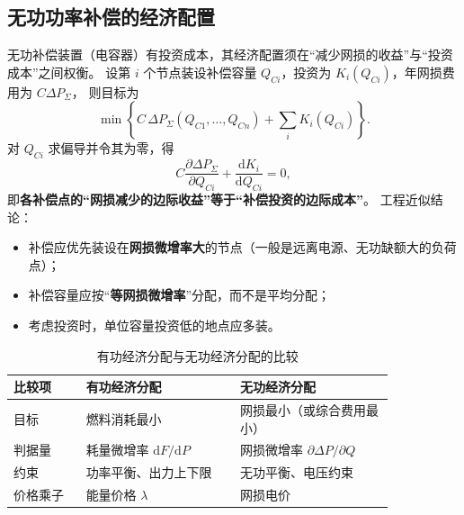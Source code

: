 \subsection{无功功率补偿的经济配置}

无功补偿装置（电容器）有投资成本，其经济配置须在“减少网损的收益”与“投资成本”之间权衡。
设第 $i$ 个节点装设补偿容量 $Q_{Ci}$，投资为 $K_i(Q_{Ci})$，年网损费用为 $C\Delta P_{\Sigma}$，
则目标为
\begin{equation}
  \min\left\{C\,\Delta P_{\Sigma}\left(Q_{C1},\dots,Q_{Cn}\right)+\sum_{i}K_i\left(Q_{Ci}\right)\right\}.
\end{equation}
对 $Q_{Ci}$ 求偏导并令其为零，得
\begin{equation}
  C\frac{\partial\Delta P_{\Sigma}}{\partial Q_{Ci}}+\frac{\mathrm{d}K_i}{\mathrm{d}Q_{Ci}}=0 ,
\end{equation}
即\textbf{各补偿点的“网损减少的边际收益”等于“补偿投资的边际成本”}。
工程近似结论：
\begin{itemize}
  \item 补偿应优先装设在\textbf{网损微增率大}的节点（一般是远离电源、无功缺额大的负荷点）；
  \item 补偿容量应按“\textbf{等网损微增率}”分配，而不是平均分配；
  \item 考虑投资时，单位容量投资低的地点应多装。
\end{itemize}

\begin{table}[htbp]
  \centering
  \caption{有功经济分配与无功经济分配的比较}
  \small
  \begin{tabular}{@{}p{0.16\linewidth}p{0.34\linewidth}p{0.34\linewidth}@{}}
    \toprule
    比较项 & 有功经济分配 & 无功经济分配 \\
    \midrule
    目标 & 燃料消耗最小 & 网损最小（或综合费用最小） \\
    判据量 & 耗量微增率 $\mathrm{d}F/\mathrm{d}P$ & 网损微增率 $\partial\Delta P/\partial Q$ \\
    约束 & 功率平衡、出力上下限 & 无功平衡、电压约束 \\
    价格乘子 & 能量价格 $\lambda$ & 网损电价 \\
    \bottomrule
  \end{tabular}
\end{table}

